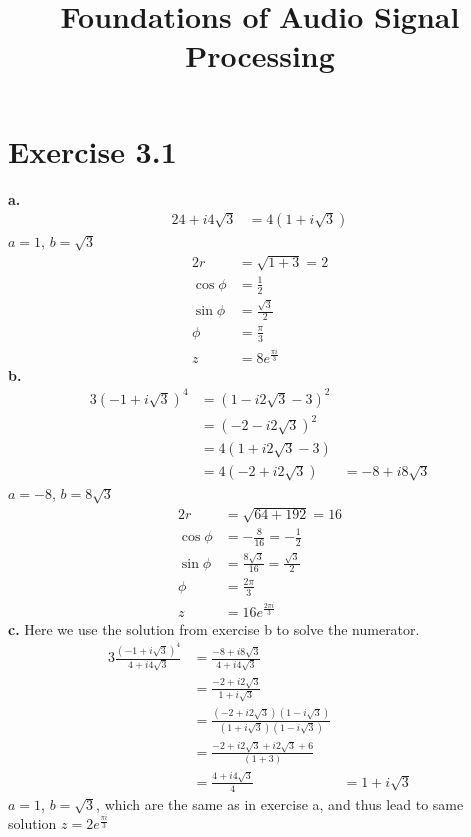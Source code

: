 \documentclass[12pt]{article}
\title{Foundations of Audio Signal Processing\\ \ass}
\author{\auth}
\begin{document}
	\maketitle
	\section*{Exercise 3.1}
	\textbf{a.}
	\begin{alignat*}{2}
	4 + i 4\sqrt{3} &= 4(1 + i \sqrt{3})
	\end{alignat*}
	$a = 1$, $b = \sqrt{3}$
	\begin{alignat*}{2}
		r &= \sqrt{1 + 3} = 2\\
		\cos\phi &= \frac{1}{2}\\
		\sin\phi &= \frac{\sqrt{3}}{2}\\
		\phi &= \frac{\pi}{3}\\
		z& = 8e^\frac{\pi i}{3}
	\end{alignat*}
	\textbf{b.}
	\begin{alignat*}{3}
		(-1 + i \sqrt{3})^4 &= (1 - i 2 \sqrt{3} - 3)^2\\
		&= (- 2 - i 2 \sqrt{3})^2\\
		&= 4 (1 + i 2 \sqrt{3} - 3)\\
		&= 4 (-2 + i 2 \sqrt{3}) &= -8 + i 8 \sqrt{3} 
	\end{alignat*}
	$a = -8$, $b = 8\sqrt{3}$
	\begin{alignat*}{2}
	r &= \sqrt{64 + 192} = 16\\
	\cos\phi &= -\frac{8}{16} = -\frac{1}{2}\\
	\sin\phi &= \frac{8\sqrt{3}}{16} = \frac{\sqrt{3}}{2}\\
	\phi &= \frac{2\pi}{3}\\
	z &= 16e^{\frac{2\pi i}{3}}
	\end{alignat*}
	\textbf{c.} Here we use the solution from exercise b to solve the numerator.
	\begin{alignat*}{3}
	\frac{(-1 + i \sqrt{3})^4}{4 + i 4 \sqrt{3}} &= \frac{-8 + i 8 \sqrt{3}}{4 + i 4 \sqrt{3}}\\
	&= \frac{-2 + i 2 \sqrt{3}}{1 + i \sqrt{3}}\\
	&= \frac{(-2 + i 2 \sqrt{3})(1 - i \sqrt{3})}{(1 + i \sqrt{3})(1 - i \sqrt{3})}\\
	&= \frac{-2 + i 2 \sqrt{3} + i 2\sqrt{3} + 6}{(1 + 3)}\\
	&= \frac{4 + i 4\sqrt{3}}{4} &= 1 + i \sqrt{3}
	\end{alignat*}
	$a = 1$, $b = \sqrt{3}$, which are the same as in exercise a, and thus lead to same solution $z = 2e^\frac{\pi i}{3}$\\
\end{document}
